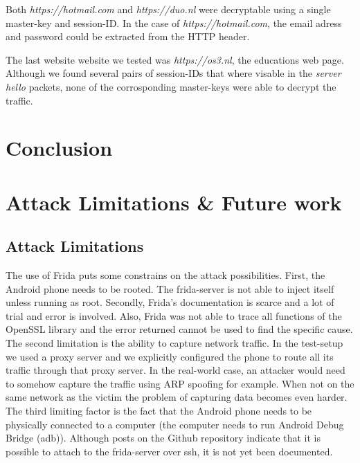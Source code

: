 \documentclass[12pt, a4paper]{report}
\begin{document}
Both \textit{https://hotmail.com} and \textit{https://duo.nl} were decryptable using a single master-key and session-ID. In the case of \textit{https://hotmail.com}, the email adress and password could be extracted from the HTTP header. 

The last website website we tested was \textit{https://os3.nl}, the educations web page. Although we found several pairs of session-IDs that where visable in the \textit{server hello} packets, none of the corrosponding master-keys were able to decrypt the traffic. 







\chapter{Conclusion}

\chapter{Attack Limitations \& Future work}


\section{Attack Limitations}
The use of Frida puts some constrains on the attack possibilities. First, the Android phone needs to be rooted. The frida-server is not able to inject itself unless running as root. Secondly, Frida's documentation is scarce and a lot of trial and error is involved. Also, Frida was not able to trace all functions of the OpenSSL library and the error returned cannot be used to find the specific cause.  
\newline
\newline
The second limitation is the ability to capture network traffic. In the test-setup we used a proxy server and we explicitly configured the phone to route all its traffic through that proxy server. In the real-world case, an attacker would need to somehow capture the traffic using ARP spoofing for example. When not on the same network as the victim the problem of capturing data becomes even harder. 
\newline
\newline
The third limiting factor is the fact that the Android phone needs to be physically connected to a computer (the computer needs to run Android Debug Bridge (adb)). Although posts on the Github repository indicate that it is possible to attach to the frida-server over ssh, it is not yet been documented.   
\end{document}
